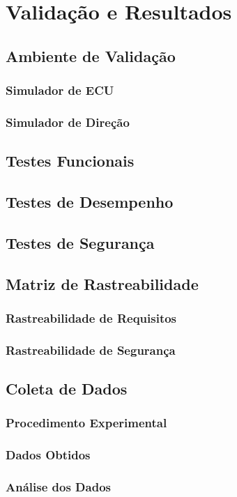 \chapter{Validação e Resultados} \label{cap:validacaotestes}

\section{Ambiente de Validação}
\subsection{Simulador de ECU}
\subsection{Simulador de Direção}
\section{Testes Funcionais}
\section{Testes de Desempenho}
\section{Testes de Segurança}
\section{Matriz de Rastreabilidade}
\subsection{Rastreabilidade de Requisitos}
\subsection{Rastreabilidade de Segurança}

\section{Coleta de Dados}

\subsection{Procedimento Experimental}

\subsection{Dados Obtidos}

\subsection{Análise dos Dados}

 
